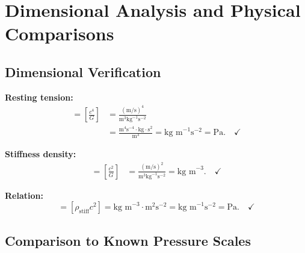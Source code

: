\documentclass[11pt,a4paper]{article}
\newcommand{\rhostiff}{\ensuremath{\rho_{\mathrm{stiff}}}}
\newcommand{\Tzero}{\ensuremath{T_0}}
\theoremstyle{definition}
\begin{document}
\section{Dimensional Analysis and Physical Comparisons}
\label{sec:dimensional}

\subsection{Dimensional Verification}
\label{sec:dim_check}

\textbf{Resting tension:}
\begin{align}
[\Tzero] = \left[\frac{c^4}{G}\right] &= \frac{(\text{m/s})^4}{\text{m}^3\text{kg}^{-1}\text{s}^{-2}} \nonumber \\
&= \frac{\text{m}^4\text{s}^{-4} \cdot \text{kg} \cdot \text{s}^2}{\text{m}^3} = \text{kg m}^{-1}\text{s}^{-2} = \text{Pa}. \quad \checkmark
\end{align}

\textbf{Stiffness density:}
\begin{align}
[\rhostiff] = \left[\frac{c^2}{G}\right] &= \frac{(\text{m/s})^2}{\text{m}^3\text{kg}^{-1}\text{s}^{-2}} = \text{kg m}^{-3}. \quad \checkmark
\end{align}

\textbf{Relation:}
\begin{equation}
[\Tzero] = [\rhostiff c^2] = \text{kg m}^{-3} \cdot \text{m}^2\text{s}^{-2} = \text{kg m}^{-1}\text{s}^{-2} = \text{Pa}. \quad \checkmark
\end{equation}

\subsection{Comparison to Known Pressure Scales}
\label{sec:pressure_comparison}
\end{document}
